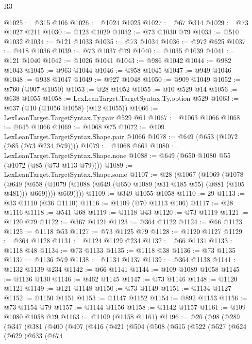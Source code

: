\begin{lexlean}{R3}
\begin{coremodule}
@1025 := @315 @106
@1026 := @1024 @1025
@1027 := @67 @314
@1029 := @73 @1027 @211
@1030 := @123 @1029
@1032 := @73 @1030 @79
@1033 := @510 @1032
@1034 := @121 @1033
@1035 := @73 @1034
@1036 := @972 @625
@1037 := @418 @1036
@1039 := @73 @1037 @79
@1040 := @1035 @1039
@1041 := @121 @1040
@1042 := @1026 @1041
@1043 := @986 @1042
@1044 := @982 @1043
@1045 := @963 @1044
@1046 := @958 @1045
@1047 := @949 @1046
@1048 := @938 @1047
@1049 := @927 @1048
@1050 := @909 @1049
@1052 := @760 (@907 @1050)
@1053 := @28 @1052
@1055 := @10 @529 @14
@1056 := @638 @1055
@1058 := LexLeanTarget.TargetSyntax.Ty.option @529
@1063 := @637 (@10 (@1056 @1058) (@12 @1055))
@1066 := LexLeanTarget.TargetSyntax.Ty.pair @529 @61
@1067 := @1063 @1066
@1068 := @645 @1066
@1069 := @1068 @75
@1072 := @109 LexLeanTarget.TargetSyntax.Shape.pair @1066
@1078 := @649 (@653 (@1072 (@85 (@73 @234 @79))))
@1079 := @1068 @661
@1080 := LexLeanTarget.TargetSyntax.Shape.none
@1088 := @649 (@650 @1080 @55 (@1072 (@85 (@73 @113 @79))))
@1089 := LexLeanTarget.TargetSyntax.Shape.some
@1107 := @28
    (@1067
      (@1069
        (@1078
          (@649
            (@658 (@1079 (@1088 (@649 (@650 @1089 (@31 @185 @55) (@881 (@105 @481))) @669))))
            @669))))
@1109 := @349 @1055 @1058
@1110 := 29
@1113 := @33 @1110 (@36 @1110)
@1116 := @1109 (@70 @1113 @106)
@1117 := @28 @1116
@1118 := @541 @68
@1119 := @1118 @43
@1120 := @73 @1119
@1121 := @1120 @79
@1122 := @367 @1121
@1123 := @364 @1122
@1124 := @66 @1123
@1125 := @1118 @53
@1127 := @73 @1125 @79
@1128 := @1120 @1127
@1129 := @364 @1128
@1131 := @1124 @1129 @234
@1132 := @66 @1131
@1133 := @1118 @48
@1134 := @73 @1133
@1135 := @1118 @38
@1136 := @73 @1135
@1137 := @1136 @79
@1138 := @1134 @1137
@1139 := @364 @1138
@1141 := @1132 @1139 @234
@1142 := @66 @1141
@1144 := @109 @1089 @1058
@1145 := @1136 @130
@1146 := @462 @1145
@1147 := @73 @1146
@1148 := @1120 @1121
@1149 := @121 @1148
@1150 := @73 @1149
@1151 := @1134 @1127
@1152 := @1150 @1151
@1153 := @1147 @1152
@1154 := @892 @1153
@1156 := @73 @1154 @79
@1157 := @1144 @1156
@1158 := @1142 @1157
@1161 := @109 @1080 @1058 @79
@1163 := @1109 (@1158 @1161)
@1196 := @26
    (@98
      (@289
        (@347
          (@381
            (@400
              (@407
                (@416
                  (@421
                    (@504
                      (@508
                        (@515
                          (@522
                            (@527
                              (@624
                                (@629
                                  (@633
                                    (@674

\end{coremodule}
\end{lexlean}
